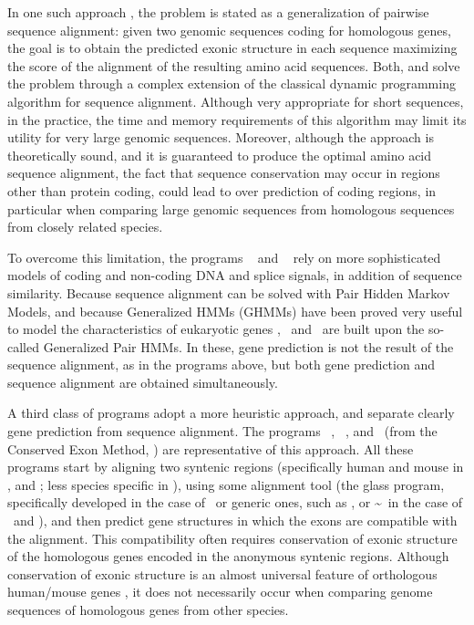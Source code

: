 In one such approach \citep{bayo:2002a, pedersen:2002a}, the problem
is stated as a generalization of pairwise sequence alignment: given
two genomic sequences coding for homologous genes, the goal is to
obtain the predicted exonic structure in each sequence maximizing the
score of the alignment of the resulting amino acid sequences. Both,
\cite{bayo:2002a} and \cite{pedersen:2002a} solve the problem through
a complex extension of the classical dynamic programming algorithm for
sequence alignment. Although very appropriate for short sequences, in
the practice, the time and memory requirements of this algorithm may
limit its utility for very large genomic sequences.  Moreover,
although the approach is theoretically sound, and it is guaranteed to
produce the optimal amino acid sequence alignment, the fact that
sequence conservation may occur in regions other than protein coding,
could lead to over prediction of coding regions, in particular when
comparing large genomic sequences from homologous sequences from
closely related species.

To overcome this limitation, the programs \slam\ \citep{pachter:2003a} and
\doublescan\ \citep{meyer:2002a} rely on more sophisticated models of coding 
and non-coding DNA and splice signals, in addition of sequence
similarity. Because sequence alignment can be solved with Pair Hidden
Markov Models\citetext{PHMMs, \citealp{durbin:1998a}}, and because
Generalized HMMs (GHMMs) have been proved very useful to model the
characteristics of eukaryotic genes \citep{burge:1997a}, \slam\ and
\doublescan\ are built upon the so-called Generalized Pair HMMs. In these,
gene prediction is not the result of the sequence alignment, as in the
programs above, but both gene prediction and sequence alignment are
obtained simultaneously.

A third class of programs adopt a more heuristic approach, and
separate clearly gene prediction from sequence alignment.  The
programs \rosseta\ \citep{batzoglou:2000a}, \sgpo\ \citetext{from Syntenic
Gene Prediction, \citealp{wiehe:2001a}}, and \cem\ (from the Conserved
Exon Method, \citealp{bafna:2000a}) are representative of this
approach.  All these programs start by aligning two syntenic regions
(specifically human and mouse in \rosseta, and \cem; less species specific
in \sgpo), using some alignment tool (the {\sc glass} program,
specifically developed in the case of \rosseta\, or generic ones, such as
\tbx, or \sim\ in the case of \cem\ and \sgp), and then predict gene
structures in which the exons are compatible with the alignment. This
compatibility often requires conservation of exonic structure of the
homologous genes encoded in the anonymous syntenic regions. Although
conservation of exonic structure is an almost universal feature of
orthologous human/mouse genes \citep{mouse:2002a}, it does not
necessarily occur when comparing genome sequences of homologous genes
from other species.
 
